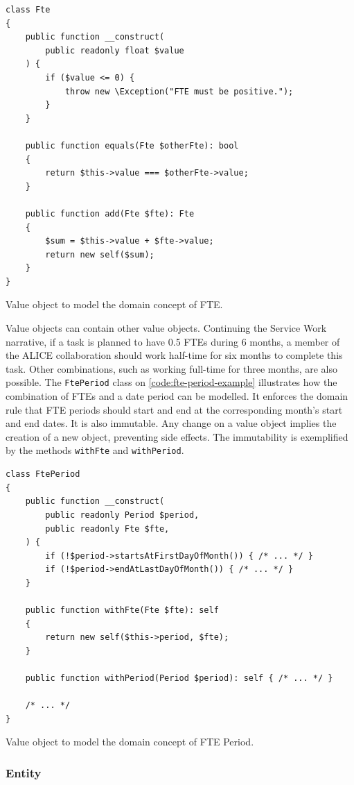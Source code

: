 \begin{listing}[htbp]
\begin{verbatim}
class Fte
{
	public function __construct(
		public readonly float $value
	) {
		if ($value <= 0) {
			throw new \Exception("FTE must be positive.");
		}
	}

	public function equals(Fte $otherFte): bool
	{
		return $this->value === $otherFte->value;
	}

	public function add(Fte $fte): Fte
	{
		$sum = $this->value + $fte->value;
		return new self($sum);
	}
}
\end{verbatim}
\caption{Value object to model the domain concept of FTE.}
\label{code:fte-example}
\end{listing}

Value objects can contain other value objects. Continuing the Service Work narrative, if a task is planned to have 0.5 FTEs during 6 months, a member of the ALICE collaboration should work half-time for six months to complete this task. Other combinations, such as working full-time for three months, are also possible. The \texttt{FtePeriod} class on \autoref{code:fte-period-example} illustrates how the combination of FTEs and a date period can be modelled. It enforces the domain rule that FTE periods should start and end at the corresponding month's start and end dates. It is also immutable. Any change on a value object implies the creation of a new object, preventing side effects. The immutability is exemplified by the methods \texttt{withFte} and \texttt{withPeriod}.

\begin{listing}[htbp]
\begin{verbatim}
class FtePeriod
{
	public function __construct(
		public readonly Period $period,
		public readonly Fte $fte,
	) {
		if (!$period->startsAtFirstDayOfMonth()) { /* ... */ }
		if (!$period->endAtLastDayOfMonth()) { /* ... */ }
	}

	public function withFte(Fte $fte): self
	{
		return new self($this->period, $fte);
	}

	public function withPeriod(Period $period): self { /* ... */ }

	/* ... */
}
\end{verbatim}
\caption{Value object to model the domain concept of FTE Period.}
\label{code:fte-period-example}
\end{listing}

\subsubsection{Entity}

